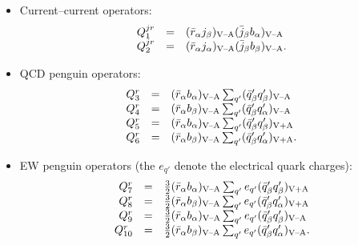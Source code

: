 \documentclass[11pt]{cernrep}
\begin{document}
\begin{itemize}
\item Current--current operators:
\begin{equation}
\begin{array}{rcl}
Q_{1}^{jr}&=&(\bar r_{\alpha}j_{\beta})_{\mbox{{\scriptsize V--A}}}
(\bar j_{\beta}b_{\alpha})_{\mbox{{\scriptsize V--A}}}\\
Q_{2}^{jr}&=&(\bar r_\alpha j_\alpha)_{\mbox{{\scriptsize 
V--A}}}(\bar j_\beta b_\beta)_{\mbox{{\scriptsize V--A}}}.
\end{array}
\end{equation}
\item QCD penguin operators:
\begin{equation}\label{qcd-penguins}
\begin{array}{rcl}
Q_{3}^r&=&(\bar r_\alpha b_\alpha)_{\mbox{{\scriptsize V--A}}}\sum_{q'}
(\bar q'_\beta q'_\beta)_{\mbox{{\scriptsize V--A}}}\\
Q_{4}^r&=&(\bar r_{\alpha}b_{\beta})_{\mbox{{\scriptsize V--A}}}
\sum_{q'}(\bar q'_{\beta}q'_{\alpha})_{\mbox{{\scriptsize V--A}}}\\
Q_{5}^r&=&(\bar r_\alpha b_\alpha)_{\mbox{{\scriptsize V--A}}}\sum_{q'}
(\bar q'_\beta q'_\beta)_{\mbox{{\scriptsize V+A}}}\\
Q_{6}^r&=&(\bar r_{\alpha}b_{\beta})_{\mbox{{\scriptsize V--A}}}
\sum_{q'}(\bar q'_{\beta}q'_{\alpha})_{\mbox{{\scriptsize V+A}}}.
\end{array}
\end{equation}
\item EW penguin operators (the $e_{q'}$ denote the
electrical quark charges):
\begin{equation}
\begin{array}{rcl}
Q_{7}^r&=&\frac{3}{2}(\bar r_\alpha b_\alpha)_{\mbox{{\scriptsize V--A}}}
\sum_{q'}e_{q'}(\bar q'_\beta q'_\beta)_{\mbox{{\scriptsize V+A}}}\\
Q_{8}^r&=&
\frac{3}{2}(\bar r_{\alpha}b_{\beta})_{\mbox{{\scriptsize V--A}}}
\sum_{q'}e_{q'}(\bar q_{\beta}'q'_{\alpha})_{\mbox{{\scriptsize V+A}}}\\
Q_{9}^r&=&\frac{3}{2}(\bar r_\alpha b_\alpha)_{\mbox{{\scriptsize V--A}}}
\sum_{q'}e_{q'}(\bar q'_\beta q'_\beta)_{\mbox{{\scriptsize V--A}}}\\
Q_{10}^r&=&
\frac{3}{2}(\bar r_{\alpha}b_{\beta})_{\mbox{{\scriptsize V--A}}}
\sum_{q'}e_{q'}(\bar q'_{\beta}q'_{\alpha})_{\mbox{{\scriptsize V--A}}}.
\end{array}
\end{equation}
\end{itemize}
\end{document}
